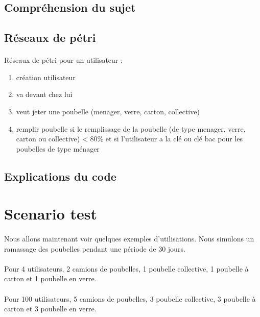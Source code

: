 \documentclass[12pt]{article}
\begin{document}
\subsection{Compréhension du sujet}


\subsection{Réseaux de pétri}
\paragraph{} Réseaux de pétri pour un utilisateur : 
\begin{enumerate}
\item création utilisateur 
\item va devant chez lui
\item veut jeter une poubelle (menager, verre, carton, collective)
\item remplir poubelle si le remplissage de la poubelle (de type menager, verre, carton ou collective) < 80\% et si l'utilisateur a la clé ou clé bac pour les poubelles de type ménager
\end{enumerate}

\subsection{Explications du code}


\section{Scenario test}
\paragraph{}Nous allons maintenant voir quelques exemples d'utilisations. Nous simulons un ramassage des poubelles pendant une période de 30 jours.

\paragraph{}Pour 4 utilisateurs, 2 camions de poubelles, 1 poubelle collective, 1 poubelle à carton et 1 poubelle en verre.

\paragraph{}Pour 100 utilisateurs, 5 camions de poubelles, 3 poubelle collective, 3 poubelle à carton et 3 poubelle en verre.
\end{document}
